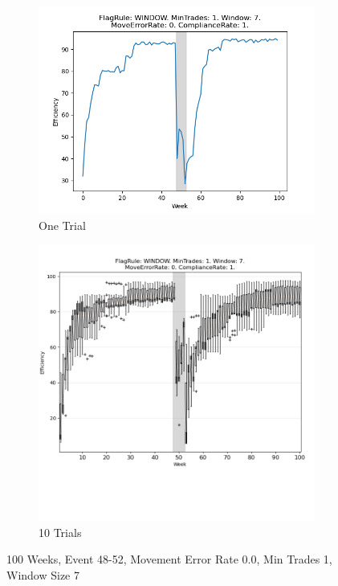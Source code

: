 \documentclass{article}%
\begin{document}
\begin{figure}[!htb]%
\begin{subfigure}[b]{0.45\linewidth}%
\includegraphics[width=\linewidth]{0049fr_WINDOW_mt_1_ws_7_er_0_cr_1_t1.png}%
\caption{One Trial}%
\end{subfigure}%
\begin{subfigure}[b]{0.45\linewidth}%
\includegraphics[clip,width=\linewidth,trim=0 4cm 0 0]{0049fr_WINDOW_mt_1_ws_7_er_0_cr_1_t10.png}%
\caption{10 Trials}%
\end{subfigure}%
\caption{100 Weeks, Event 48{-}52, Movement Error Rate 0.0, Min Trades 1, Window Size 7}%
\end{figure}
\end{document}
